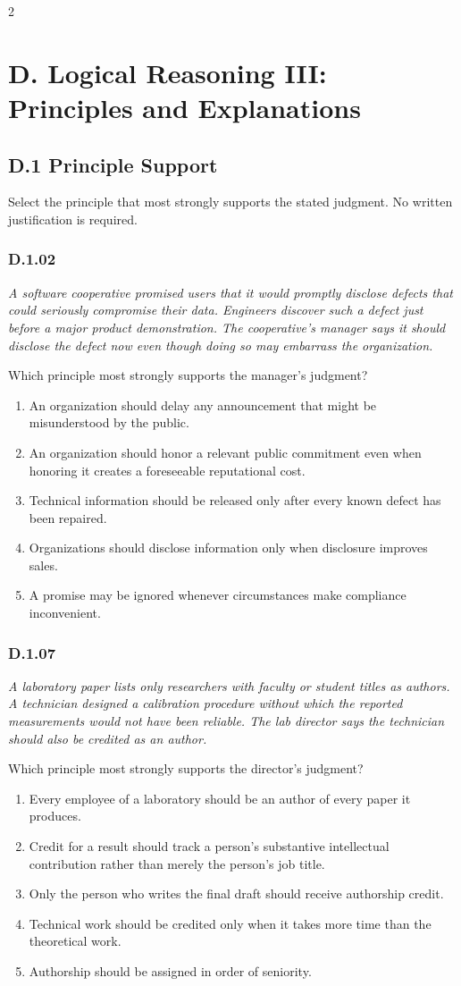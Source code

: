 \documentclass[10pt]{extarticle}
\newcommand{\choice}[1]{\item #1}
\newcommand{\bankitem}[1]{\subsubsection*{#1}}
\begin{document}
\begin{multicols}{2}
\section*{D. Logical Reasoning III: Principles and Explanations}
\subsection*{D.1 Principle Support}
Select the principle that most strongly supports the stated judgment. No written justification is required.
\begin{samepage}
\bankitem{D.1.02}
\emph{A software cooperative promised users that it would promptly disclose defects that could seriously compromise their data. Engineers discover such a defect just before a major product demonstration. The cooperative's manager says it should disclose the defect now even though doing so may embarrass the organization.}

Which principle most strongly supports the manager's judgment?
\begin{enumerate}[label=(\alph*)]
  \choice{An organization should delay any announcement that might be misunderstood by the public.}
  \choice{An organization should honor a relevant public commitment even when honoring it creates a foreseeable reputational cost.}
  \choice{Technical information should be released only after every known defect has been repaired.}
  \choice{Organizations should disclose information only when disclosure improves sales.}
  \choice{A promise may be ignored whenever circumstances make compliance inconvenient.}
\end{enumerate}
\end{samepage}\par\smallskip
\begin{samepage}
\bankitem{D.1.07}
\emph{A laboratory paper lists only researchers with faculty or student titles as authors. A technician designed a calibration procedure without which the reported measurements would not have been reliable. The lab director says the technician should also be credited as an author.}

Which principle most strongly supports the director's judgment?
\begin{enumerate}[label=(\alph*)]
  \choice{Every employee of a laboratory should be an author of every paper it produces.}
  \choice{Credit for a result should track a person's substantive intellectual contribution rather than merely the person's job title.}
  \choice{Only the person who writes the final draft should receive authorship credit.}
  \choice{Technical work should be credited only when it takes more time than the theoretical work.}
  \choice{Authorship should be assigned in order of seniority.}
\end{enumerate}
\end{samepage}\par\smallskip

\end{multicols}
\end{document}
